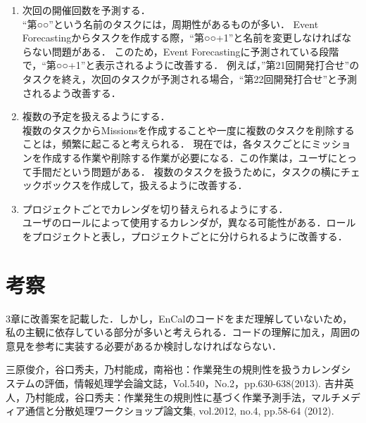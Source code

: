 \documentclass[fleqn, 14pt]{extarticlej}
\begin{document}
\begin{enumerate}
	\item 次回の開催回数を予測する．\\ 
“第○○”という名前のタスクには，周期性があるものが多い．
Event Forecastingからタスクを作成する際，“第○○+1”と名前を変更しなければならない問題がある．
このため，Event Forecastingに予測されている段階で，“第○○+1”と表示されるように改善する．
例えば，”第21回開発打合せ”のタスクを終え，次回のタスクが予測される場合，“第22回開発打合せ”と予測されるよう改善する．
	
	\item 複数の予定を扱えるようにする．\\ 
複数のタスクからMissionsを作成することや一度に複数のタスクを削除することは，頻繁に起こると考えられる．
現在では，各タスクごとにミッションを作成する作業や削除する作業が必要になる．この作業は，ユーザにとって手間だという問題がある．
複数のタスクを扱うために，タスクの横にチェックボックスを作成して，扱えるように改善する．

	\item プロジェクトごとでカレンダを切り替えられるようにする．\\ 
ユーザのロールによって使用するカレンダが，異なる可能性がある．ロールをプロジェクトと表し，プロジェクトごとに分けられるように改善する．

\end{enumerate}

\section{考察}
3章に改善案を記載した．しかし，EnCalのコードをまだ理解していないため，私の主観に依存している部分が多いと考えられる．コードの理解に加え，周囲の意見を参考に実装する必要があるか検討しなければならない．

\begin{thebibliography}{99}
三原俊介，谷口秀夫，乃村能成，南裕也：作業発生の規則性を扱うカレンダシステムの評価，情報処理学会論文誌，Vol.540，No.2，pp.630-638(2013).
吉井英人，乃村能成，谷口秀夫：作業発生の規則性に基づく作業予測手法，マルチメディア通信と分散処理ワークショップ論文集, vol.2012, no.4, pp.58-64 (2012).

\end{thebibliography}
\end{document}
